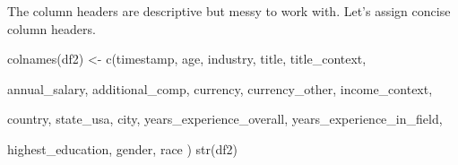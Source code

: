 \documentclass[
]{article}
\newenvironment{Shaded}{\begin{snugshade}}{\end{snugshade}}
\newcommand{\FunctionTok}[1]{\textcolor[rgb]{0.00,0.00,0.00}{#1}}
\newcommand{\NormalTok}[1]{#1}
\newcommand{\OtherTok}[1]{\textcolor[rgb]{0.56,0.35,0.01}{#1}}
\newcommand{\StringTok}[1]{\textcolor[rgb]{0.31,0.60,0.02}{#1}}
\begin{document}
The column headers are descriptive but messy to work with. Let's assign
concise column headers.

\begin{Shaded}
\begin{Highlighting}[]
\FunctionTok{colnames}\NormalTok{(df2) }\OtherTok{\textless{}{-}} \FunctionTok{c}\NormalTok{(}\StringTok{\textquotesingle{}timestamp\textquotesingle{}}\NormalTok{, }
                   \StringTok{\textquotesingle{}age\textquotesingle{}}\NormalTok{, }
                   \StringTok{\textquotesingle{}industry\textquotesingle{}}\NormalTok{, }
                   \StringTok{\textquotesingle{}title\textquotesingle{}}\NormalTok{,}
                   \StringTok{\textquotesingle{}title\_context\textquotesingle{}}\NormalTok{,}
                   
                   \StringTok{\textquotesingle{}annual\_salary\textquotesingle{}}\NormalTok{,}
                   \StringTok{\textquotesingle{}additional\_comp\textquotesingle{}}\NormalTok{,}
                   \StringTok{\textquotesingle{}currency\textquotesingle{}}\NormalTok{,}
                   \StringTok{\textquotesingle{}currency\_other\textquotesingle{}}\NormalTok{,}
                   \StringTok{\textquotesingle{}income\_context\textquotesingle{}}\NormalTok{,}
                   
                   \StringTok{\textquotesingle{}country\textquotesingle{}}\NormalTok{,}
                   \StringTok{\textquotesingle{}state\_usa\textquotesingle{}}\NormalTok{,}
                   \StringTok{\textquotesingle{}city\textquotesingle{}}\NormalTok{,}
                   \StringTok{\textquotesingle{}years\_experience\_overall\textquotesingle{}}\NormalTok{,}
                   \StringTok{\textquotesingle{}years\_experience\_in\_field\textquotesingle{}}\NormalTok{,}
                   
                   \StringTok{\textquotesingle{}highest\_education\textquotesingle{}}\NormalTok{,}
                   \StringTok{\textquotesingle{}gender\textquotesingle{}}\NormalTok{,}
                   \StringTok{\textquotesingle{}race\textquotesingle{}}
\NormalTok{                   )}
\FunctionTok{str}\NormalTok{(df2)}
\end{Highlighting}
\end{Shaded}
\end{document}
